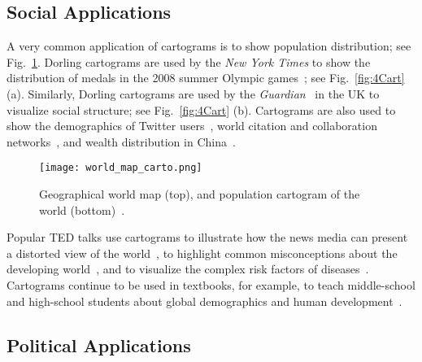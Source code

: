 \documentclass{egpubl}
\begin{document}
\subsection{Social Applications}
\label{Social}

A very common application of cartograms is to show population distribution; see Fig.~\ref{fig:population}. Dorling cartograms are used by the \textit{New York Times} to show the distribution of medals in the 2008 summer Olympic games~\cite{NYT_O}; see Fig.~\ref{fig:4Cart} (a). Similarly, Dorling cartograms are used by the \textit{Guardian}~\cite{Guar} in the UK to visualize social structure; see Fig.~\ref{fig:4Cart} (b).
Cartograms are also used to show the demographics of Twitter users~\cite{mislove2011understanding}, world citation and collaboration networks~\cite{pan2012world}, and wealth distribution in China~\cite{li2012cartograms}.


\begin{figure}[htbp]
\begin{center}
\texttt{[image: world\_map\_carto.png]}
\caption{Geographical world map (top), and population cartogram of the world (bottom)~\cite{map_week}.}
\label{fig:population}
\end{center}
\end{figure}


Popular TED talks use cartograms to illustrate how the news media can present a distorted view of the world~\cite{Alisa}, to highlight common misconceptions about the developing world~\cite{Hans2}, and to visualize the complex risk factors of diseases~\cite{Hans}. 
 Cartograms continue to be used in textbooks, for example, to teach middle-school and high-school students about global demographics and human development~\cite{Class1, Class2}.

\begin{comment}

\begin{figure}[htbp]
\begin{center}
\texttt{[image: pop\_soviet]}
\caption{Population cartogram of former Soviet Union~\cite{kocmoud1997constructing}}
\label{fig:sovt}
\end{center}
\end{figure} 
\end{comment}




\subsection{Political Applications}
\end{document}
